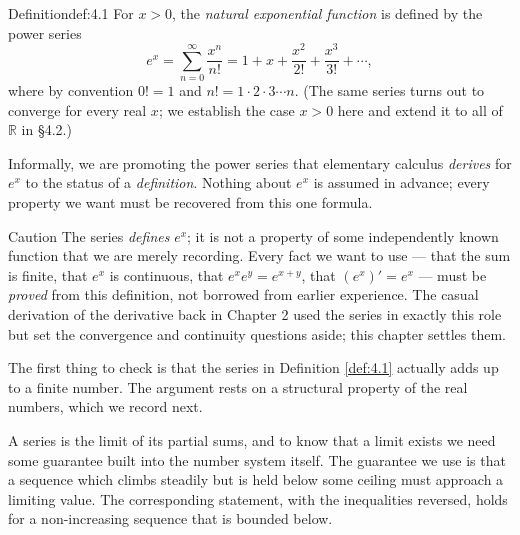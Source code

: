 \documentclass[a4paper,12pt,oneside]{memoir}
\begin{document}
\begin{envdefinition}{Definition}{def:4.1}{}
For \(x > 0\), the \emph{natural exponential function} is defined by the power series \[ e^{x} = \sum_{n = 0}^{\infty} \frac{x^{n}}{n!} = 1 + x + \frac{x^{2}}{2!} + \frac{x^{3}}{3!} + \cdots, \] where by convention \(0! = 1\) and \(n! = 1 \cdot 2 \cdot 3 \cdots n\). (The same series turns out to converge for every real \(x\); we establish the case \(x > 0\) here and extend it to all of \(\mathbb{R}\) in §4.2.)

\begin{informal}
Informally, we are promoting the power series that elementary calculus \emph{derives} for \(e^{x}\) to the status of a \emph{definition}. Nothing about \(e^{x}\) is assumed in advance; every property we want must be recovered from this one formula.
\end{informal}
\end{envdefinition}
\begin{envcaution}{Caution}{}{}
The series \emph{defines} \(e^{x}\); it is not a property of some independently known function that we are merely recording. Every fact we want to use — that the sum is finite, that \(e^{x}\) is continuous, that \(e^{x} e^{y} = e^{x + y}\), that \((e^{x})' = e^{x}\) — must be \emph{proved} from this definition, not borrowed from earlier experience. The casual derivation of the derivative back in Chapter 2 used the series in exactly this role but set the convergence and continuity questions aside; this chapter settles them.
\end{envcaution}
The first thing to check is that the series in Definition \ref{def:4.1} actually adds up to a finite number. The argument rests on a structural property of the real numbers, which we record next.

A series is the limit of its partial sums, and to know that a limit exists we need some guarantee built into the number system itself. The guarantee we use is that a sequence which climbs steadily but is held below some ceiling must approach a limiting value. The corresponding statement, with the inequalities reversed, holds for a non-increasing sequence that is bounded below.
\end{document}
